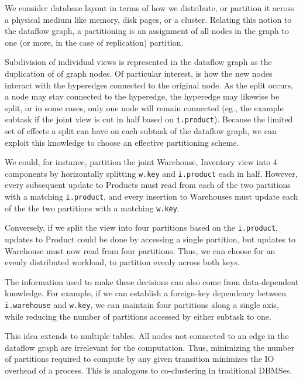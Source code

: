 We consider database layout in terms of how we distribute, or partition it across a physical medium like memory, disk pages, or a cluster.  Relating this notion to the dataflow graph, a partitioning is an assignment of all nodes in the graph to one (or more, in the case of replication) partition.  

Subdivision of individual views is represented in the dataflow graph as the duplication of  of graph nodes.  Of particular interest, is how the new nodes interact with the hyperedges connected to the original node.  As the split occurs, a node may stay connected to the hyperedge, the hyperedge may likewise be split, or in some cases, only one node will remain connected (eg., the example subtask if the joint view is cut in half based on \texttt{i.product}).  Because the limited set of effects a split can have on each subtask of the dataflow graph, we can exploit this knowledge to choose an effective partitioning scheme.

We could, for instance, partition the joint Warehouse, Inventory view into 4 components by horizontally splitting \texttt{w.key} and \texttt{i.product} each in half.  However, every subsequent update to Products must read from each of the two partitions with a matching \texttt{i.product}, and every insertion to Warehouses must update each of the the two partitions with a matching \texttt{w.key}.  

Conversely, if we split the view into four partitions based on the \texttt{i.product}, updates to Product could be done by accessing a single partition, but updates to Warehouse must now read from four partitions.  Thus, we can choose for an evenly distributed workload, to partition evenly across both keys.

The information used to make these decisions can also come from data-dependent knowledge.  For example, if we can establish a foreign-key dependency between \texttt{i.warehouse} and \texttt{w.key}, we can maintain four partitions along a single axis, while reducing the number of partitions accessed by either subtask to one.

This idea extends to multiple tables.  All nodes not connected to an edge in the dataflow graph are irrelevant for the computation.  Thus, minimizing the number of partitions required to compute by any given transition minimizes the IO overhead of a process.  This is analogous to co-clustering in traditional DBMSes.

